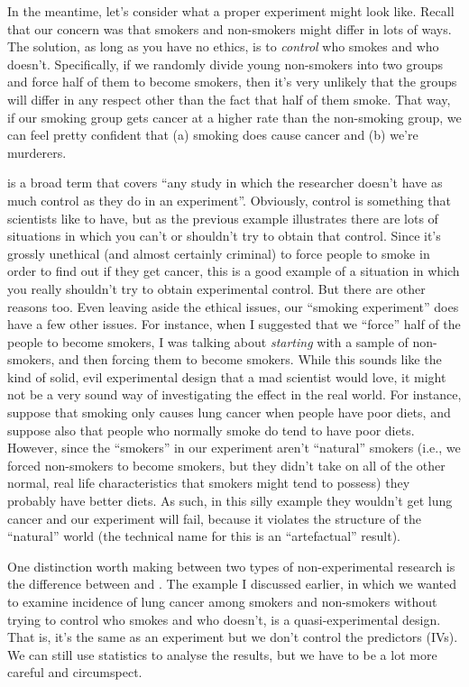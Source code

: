In the meantime, let's consider what a proper experiment might look like. Recall that our concern was that smokers and non-smokers might differ in lots of ways. The solution, as long as you have no ethics, is to {\it control} who smokes and who doesn't. Specifically, if we randomly divide young non-smokers into two groups and force half of them to become smokers, then it's very unlikely that the groups will differ in any respect other than the fact that half of them smoke. That way, if our smoking group gets cancer at a higher rate than the non-smoking group, we can feel pretty confident that (a) smoking does cause cancer and (b) we're murderers. 


 is a broad term that covers ``any study in which the researcher doesn't have as much control as they do in an experiment''. Obviously, control is something that scientists like to have, but as the previous example illustrates there are lots of situations in which you can't or shouldn't try to obtain that control. Since it's  grossly unethical (and almost certainly criminal) to force people to smoke in order to find out if they get cancer, this is a good example of a situation in which you really shouldn't try to obtain experimental control. But there are other reasons too. Even leaving aside the ethical issues, our ``smoking experiment'' does have a few other issues. For instance, when I suggested that we ``force'' half of the people to become smokers, I was talking about {\it starting} with a sample of non-smokers, and then forcing them to become smokers. While this sounds like the kind of solid, evil experimental design that a mad scientist would love, it might not be a very sound way of investigating the effect in the real world. For instance, suppose that smoking only causes lung cancer when people have poor diets, and suppose also that people who normally smoke do tend to have poor diets. However, since the ``smokers'' in our experiment aren't ``natural'' smokers (i.e., we forced non-smokers to become smokers, but they didn't take on all of the other normal, real life characteristics that smokers might tend to possess) they probably have better diets. As such, in this silly example they wouldn't get lung cancer and our experiment will fail, because it violates the structure of the ``natural'' world (the technical name for this is an ``artefactual'' result).

One distinction worth making between two types of non-experimental research is the difference between  and . The example I discussed earlier, in which we wanted to examine incidence of lung cancer among smokers and non-smokers without trying to control who smokes and who doesn't, is a quasi-experimental design. That is, it's the same as an experiment but we don't control the predictors (IVs). We can still use statistics to analyse the results, but we have to be a lot more careful and circumspect.


